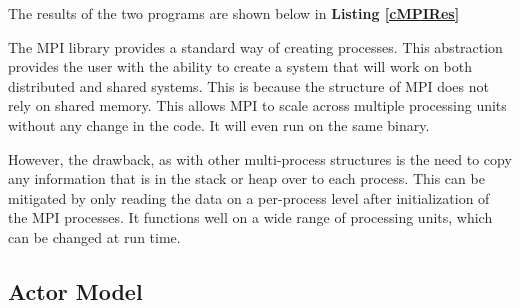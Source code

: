 \documentclass[12pt]{article}
\newcommand{\codeRef}[1]{\textbf{Listing \ref{#1}}}
\begin{document}



The results of the two programs are shown below in \codeRef{cMPIRes}



The MPI library provides a standard way of creating processes. This abstraction provides the user with the ability to create a system that will work on both distributed and shared systems. This is because the structure of MPI does not rely on shared memory. This allows MPI to scale across multiple processing units without any change in the code. It will even run on the same binary.

However, the drawback, as with other multi-process structures is the need to copy any information that is in the stack or heap over to each process. This can be mitigated by only reading the data on a per-process level after initialization of the MPI processes. It functions well on a wide range of processing units, which can be changed at run time.

\subsection{Actor Model}
\end{document}
